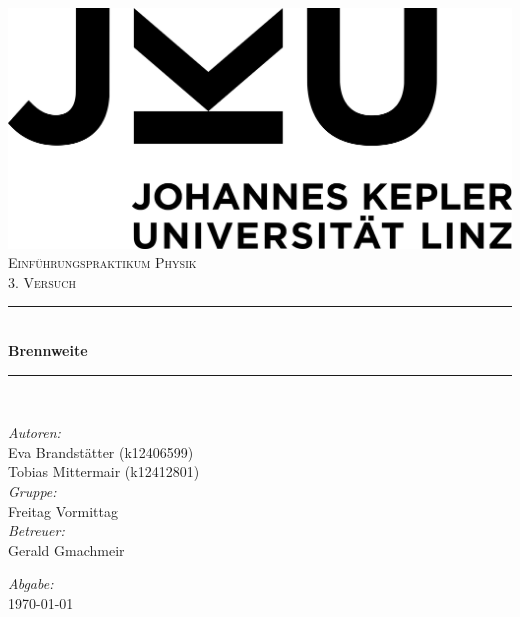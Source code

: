 \documentclass[a4paper,12pt]{article}
\begin{document}
\begin{titlepage}
    \centering
    \includegraphics[scale = 0.03]{bilder/JKU_Logo.png}\\[1.0 cm]   %
    \textsc{\Large Einführungspraktikum Physik}\\[0.5 cm]           %
    \textsc{\large 3. Versuch}\\[0.5 cm]                            %
    \rule{\linewidth}{0.4 mm} \\[0.4 cm]
    { \huge \bfseries Brennweite}\\                                 %
    \rule{\linewidth}{0.4 mm} \\[1.5 cm]
    \begin{minipage}{0.8\textwidth}
        \begin{flushleft} \large
            \emph{Autoren:}\\
            Eva Brandstätter (k12406599)\\
            Tobias Mittermair (k12412801)\\
            \vspace{1cm}
            \emph{Gruppe:}\\
            Freitag Vormittag\\
            \vspace{1cm}
            \emph{Betreuer:}\\
            Gerald Gmachmeir
        \end{flushleft}
        \begin{flushright} \large
            \vspace{8cm}
            \emph{Abgabe:} \\
            \today
        \end{flushright}
    \end{minipage}~    
\end{titlepage}
\end{document}
